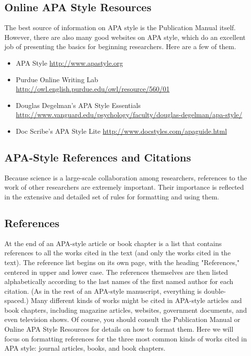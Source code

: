\subsection{Online APA Style Resources}
 
 The best source of information on APA style is the Publication Manual itself. However, there are also many good websites on APA style, which do an excellent job of presenting the basics for beginning researchers. Here are a few of them.

 
 \begin{itemize}
 \item APA Style
\url{http://www.apastyle.org}
 \item Purdue Online Writing Lab \url{http://owl.english.purdue.edu/owl/resource/560/01}

 \item Douglas Degelman's APA Style Essentials
\url{http://www.vanguard.edu/psychology/faculty/douglas-degelman/apa-style/}

  \item Doc Scribe's APA Style Lite
\url{http://www.docstyles.com/apaguide.html}

 \end{itemize}
 
 \subsection{APA-Style References and Citations}
 
 Because science is a large-scale collaboration among researchers, references to the work of other researchers are extremely important. Their importance is reflected in the extensive and detailed set of rules for formatting and using them.

 
 \subsection{References}

At the end of an APA-style article or book chapter is a list that contains references to all the works cited in the text (and only the works cited in the text). The reference list begins on its own page, with the heading "References," centered in upper and lower case. The references themselves are then listed alphabetically according to the last names of the first named author for each citation. (As in the rest of an APA-style manuscript, everything is double- spaced.) Many different kinds of works might be cited in APA-style articles and book chapters, including magazine articles, websites, government documents, and even television shows. Of course, you should consult the Publication Manual or Online APA Style Resources for details on how to format them. Here we will focus on formatting references for the three most common kinds of works cited in APA style: journal articles, books, and book chapters.


